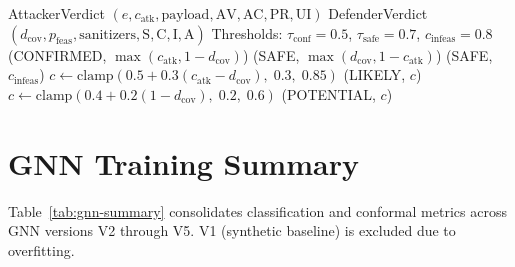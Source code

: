 \begin{algorithm}[H]
\caption{Dual-Agent Consensus Protocol}
\label{alg:app-consensus}
\begin{algorithmic}[1]
\Require AttackerVerdict $(e, c_{\text{atk}}, \text{payload}, \text{AV}, \text{AC}, \text{PR}, \text{UI})$
\Require DefenderVerdict $(d_{\text{cov}}, p_{\text{feas}}, \text{sanitizers}, \text{S}, \text{C}, \text{I}, \text{A})$
\Require Thresholds: $\tau_{\text{conf}} = 0.5$, $\tau_{\text{safe}} = 0.7$, $c_{\text{infeas}} = 0.8$
 
    \State \Return (CONFIRMED, $\max(c_{\text{atk}}, 1 - d_{\text{cov}})$)
 
    \State \Return (SAFE, $\max(d_{\text{cov}}, 1 - c_{\text{atk}})$)
 
    \State \Return (SAFE, $c_{\text{infeas}}$)
 
    \State $c \gets \text{clamp}(0.5 + 0.3(c_{\text{atk}} - d_{\text{cov}}),\; 0.3,\; 0.85)$
    \State \Return (LIKELY, $c$)
\Else {}
    \State $c \gets \text{clamp}(0.4 + 0.2(1 - d_{\text{cov}}),\; 0.2,\; 0.6)$
    \State \Return (POTENTIAL, $c$)
\EndIf
\end{algorithmic}
\end{algorithm}

\section{GNN Training Summary}
\label{app:gnn-history}

Table~\ref{tab:gnn-summary} consolidates classification and conformal metrics across GNN versions V2 through V5. V1 (synthetic baseline) is excluded due to overfitting.

